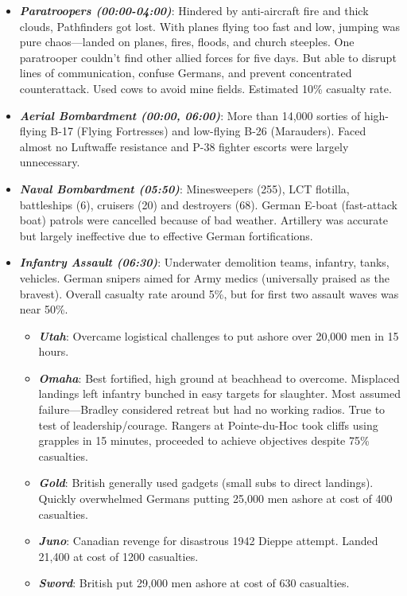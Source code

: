 \documentclass[
]{article}
\begin{document}
\begin{itemize}
\item
  \textbf{\emph{Paratroopers (00:00-04:00)}}: Hindered by anti-aircraft
  fire and thick clouds, Pathfinders got lost. With planes flying too
  fast and low, jumping was pure chaos---landed on planes, fires,
  floods, and church steeples. One paratrooper couldn't find other
  allied forces for five days. But able to disrupt lines of
  communication, confuse Germans, and prevent concentrated
  counterattack. Used cows to avoid mine fields. Estimated 10\% casualty
  rate.
\item
  \textbf{\emph{Aerial Bombardment (00:00, 06:00)}}: More than 14,000
  sorties of high-flying B-17 (Flying Fortresses) and low-flying B-26
  (Marauders). Faced almost no Luftwaffe resistance and P-38 fighter
  escorts were largely unnecessary.
\item
  \textbf{\emph{Naval Bombardment (05:50)}}: Minesweepers (255), LCT
  flotilla, battleships (6), cruisers (20) and destroyers (68). German
  E-boat (fast-attack boat) patrols were cancelled because of bad
  weather. Artillery was accurate but largely ineffective due to
  effective German fortifications.
\item
  \textbf{\emph{Infantry Assault (06:30)}}: Underwater demolition teams,
  infantry, tanks, vehicles. German snipers aimed for Army medics
  (universally praised as the bravest). Overall casualty rate around
  5\%, but for first two assault waves was near 50\%.

  \begin{itemize}
  \item
    \textbf{\emph{Utah}}: Overcame logistical challenges to put ashore
    over 20,000 men in 15 hours.
  \item
    \textbf{\emph{Omaha}}: Best fortified, high ground at beachhead to
    overcome. Misplaced landings left infantry bunched in easy targets
    for slaughter. Most assumed failure---Bradley considered retreat but
    had no working radios. True to test of leadership/courage. Rangers
    at Pointe-du-Hoc took cliffs using grapples in 15 minutes, proceeded
    to achieve objectives despite 75\% casualties.
  \item
    \textbf{\emph{Gold}}: British generally used gadgets (small subs to
    direct landings). Quickly overwhelmed Germans putting 25,000 men
    ashore at cost of 400 casualties.
  \item
    \textbf{\emph{Juno}}: Canadian revenge for disastrous 1942 Dieppe
    attempt. Landed 21,400 at cost of 1200 casualties.
  \item
    \textbf{\emph{Sword}}: British put 29,000 men ashore at cost of 630
    casualties.
  \end{itemize}
\end{itemize}
\end{document}
